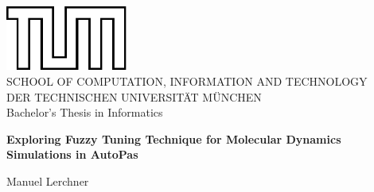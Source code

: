 \documentclass[11pt,
               a4paper,
               bibtotoc,
               idxtotoc,
               headsepline,
               footsepline,
               footexclude,
               BCOR12mm,
               DIV13,
               openany,   %
               ]
               {scrbook}
\def\doctype{Bachelor's Thesis\xspace}
\def\studyProgram{Informatics}
\def\title{Exploring Fuzzy Tuning Technique for Molecular Dynamics Simulations in AutoPas}
\def\author{Manuel Lerchner}
\begin{document}
\frontmatter

\def\bcorcor{0.15cm}
\addtolength{\hoffset}{\bcorcor}
\thispagestyle{empty}
\vspace{4cm}
\begin{center}
    \includegraphics[width=4cm]{templateStuff/tumlogo.pdf}\\[5mm]
    \huge SCHOOL OF COMPUTATION, INFORMATION AND TECHNOLOGY\\[5mm]
    \large DER TECHNISCHEN UNIVERSITÄT MÜNCHEN\\[24mm]

    {\Large \doctype in \studyProgram}\\[20mm]
    {\huge\textbf{\title}\par}
    \vspace{15mm}
    {\LARGE  \author}
\end{center}

\cleardoubleemptypage

\end{document}
